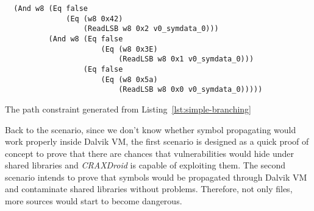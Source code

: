 \begin{listing}[H]
  \begin{verbatim}
  (And w8 (Eq false
              (Eq (w8 0x42)
                  (ReadLSB w8 0x2 v0_symdata_0)))
          (And w8 (Eq false
                      (Eq (w8 0x3E)
                          (ReadLSB w8 0x1 v0_symdata_0)))
                  (Eq false
                      (Eq (w8 0x5a)
                          (ReadLSB w8 0x0 v0_symdata_0)))))
  \end{verbatim}
  \caption{The path constraint generated from Listing~\ref{lst:simple-branching}}
  \label{lst:simple-branching-constraints}
\end{listing}

Back to the scenario, since we don't know whether symbol propagating would work
properly inside Dalvik VM, the first scenario is designed as a quick proof of
concept to prove that there are chances that vulnerabilities would hide under
shared libraries and \emph{CRAXDroid} is capable of exploiting them. The second
scenario intends to prove that symbols would be propagated through Dalvik VM
and contaminate shared libraries without problems. Therefore, not only files,
more sources would start to become dangerous.
